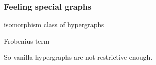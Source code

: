 \begin{frame}
    \frametitle{Feeling special graphs}

    \centering

    \begin{minipage}{0.45\textwidth}
        \begin{center}
            isomorphism class of hypergraphs

            \vspace{1em}

        \end{center}
    \end{minipage}
    \quad
    \raisebox{-1em}{\(\leftrightarrow\)}
    \pause
    \begin{minipage}{0.45\textwidth}
        \begin{center}
            Frobenius term

            \vspace{1em}

        \end{center}
    \end{minipage}

    \vspace{1em}
    \pause
    \normalsize
    \scalebox{0.75}{\hypergraphpeople}

    \vspace{1em}
    \Large
    \pause

    So vanilla hypergraphs are \alert{not restrictive enough}.

\end{frame}

